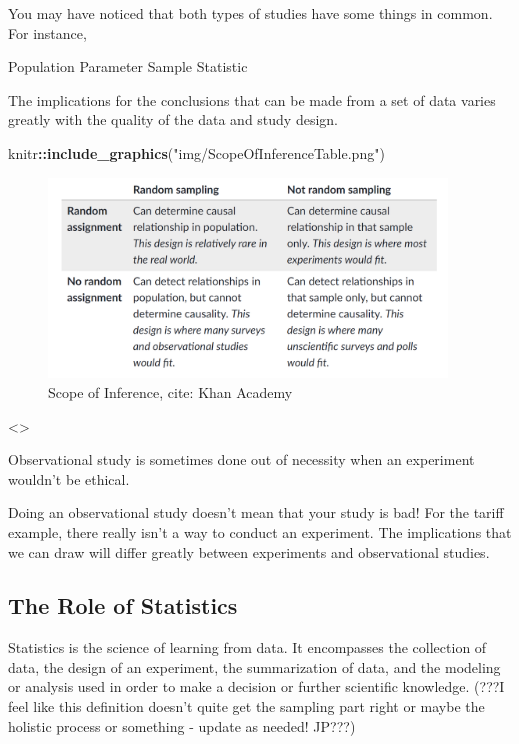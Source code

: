 \documentclass[]{book}
\newenvironment{Shaded}{\begin{snugshade}}{\end{snugshade}}
\newcommand{\KeywordTok}[1]{\textcolor[rgb]{0.13,0.29,0.53}{\textbf{#1}}}
\newcommand{\StringTok}[1]{\textcolor[rgb]{0.31,0.60,0.02}{#1}}
\newcommand{\OperatorTok}[1]{\textcolor[rgb]{0.81,0.36,0.00}{\textbf{#1}}}
\newcommand{\NormalTok}[1]{#1}
\theoremstyle{definition}
\theoremstyle{definition}
\theoremstyle{definition}
\theoremstyle{remark}
\begin{document}
You may have noticed that both types of studies have some things in
common. For instance,

Population Parameter Sample Statistic

The implications for the conclusions that can be made from a set of data
varies greatly with the quality of the data and study design.

\begin{Shaded}
\begin{Highlighting}[]
\NormalTok{knitr}\OperatorTok{::}\KeywordTok{include_graphics}\NormalTok{(}\StringTok{"img/ScopeOfInferenceTable.png"}\NormalTok{)}
\end{Highlighting}
\end{Shaded}

\begin{figure}
\includegraphics[width=400px]{img/ScopeOfInferenceTable} \caption{Scope of Inference, cite: Khan Academy}\label{fig:scopeTable}
\end{figure}

\textless{}\textgreater{}

Observational study is sometimes done out of necessity when an
experiment wouldn't be ethical.

Doing an observational study doesn't mean that your study is bad! For
the tariff example, there really isn't a way to conduct an experiment.
The implications that we can draw will differ greatly between
experiments and observational studies.

\subsection{The Role of Statistics}\label{the-role-of-statistics}

Statistics is the science of learning from data. It encompasses the
collection of data, the design of an experiment, the summarization of
data, and the modeling or analysis used in order to make a decision or
further scientific knowledge. (???I feel like this definition doesn't
quite get the sampling part right or maybe the holistic process or
something - update as needed! JP???)
\end{document}
